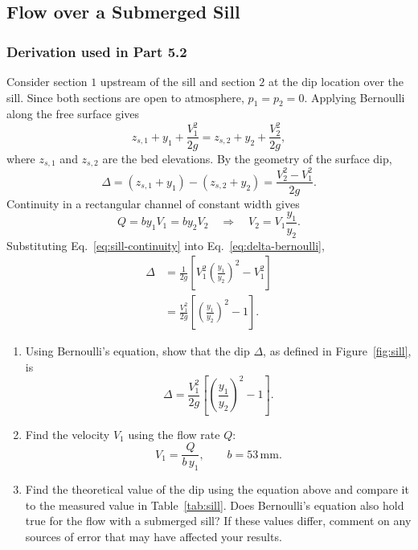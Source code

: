 \documentclass[12pt,letterpaper]{article}
\begin{document}
\subsection{Flow over a Submerged Sill}
\subsubsection*{Derivation used in Part 5.2}
Consider section \(1\) upstream of the sill and section \(2\) at the dip location over the sill. Since both sections are open to atmosphere, \(p_1=p_2=0\). Applying Bernoulli along the free surface gives
\begin{equation}
z_{s,1} + y_1 + \frac{V_1^2}{2g}
=
z_{s,2} + y_2 + \frac{V_2^2}{2g},
\end{equation}
where \(z_{s,1}\) and \(z_{s,2}\) are the bed elevations. By the geometry of the surface dip,
\begin{equation}
\Delta = (z_{s,1}+y_1) - (z_{s,2}+y_2)
= \frac{V_2^2 - V_1^2}{2g}.
\label{eq:delta-bernoulli}
\end{equation}
Continuity in a rectangular channel of constant width gives
\begin{equation}
Q = by_1V_1 = by_2V_2
\quad\Longrightarrow\quad
V_2 = V_1\frac{y_1}{y_2}.
\label{eq:sill-continuity}
\end{equation}
Substituting Eq.~\eqref{eq:sill-continuity} into Eq.~\eqref{eq:delta-bernoulli},
\begin{align}
\Delta
&=
\frac{1}{2g}\left[V_1^2\left(\frac{y_1}{y_2}\right)^2 - V_1^2\right] \\
&=
\frac{V_1^2}{2g}\left[\left(\frac{y_1}{y_2}\right)^2 - 1\right].
\label{eq:sill-dip-derived}
\end{align}

\begin{enumerate}[leftmargin=*]
    \item Using Bernoulli’s equation, show that the dip \(\Delta\), as defined in Figure~\ref{fig:sill}, is
    \[
    \Delta =
    \frac{V_1^2}{2g}
    \left[
    \left(\frac{y_1}{y_2}\right)^2 - 1
    \right].
    \]
    \item Find the velocity \(V_1\) using the flow rate \(Q\):
    \begin{equation}
    V_1 = \frac{Q}{b\,y_1},
    \qquad b = 53\,\text{mm}.
    \end{equation}
    \item Find the theoretical value of the dip using the equation above and compare it to the measured value in Table~\ref{tab:sill}. Does Bernoulli’s equation also hold true for the flow with a submerged sill? If these values differ, comment on any sources of error that may have affected your results.
\end{enumerate}
\end{document}
